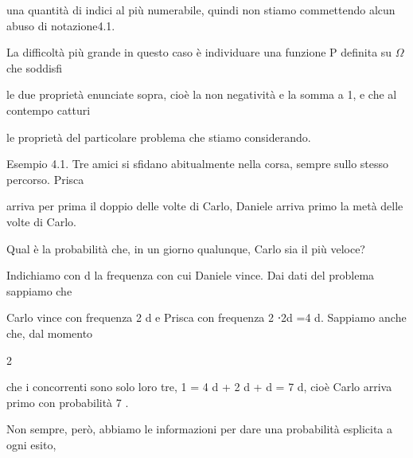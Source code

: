 \documentclass[a4paper,portrait,12pt]{article}
\begin{document}
\begin{flushleft}
una quantit\`{a} di indici al più numerabile, quindi non stiamo commettendo alcun abuso di notazione4.1.
\end{flushleft}


\begin{flushleft}
La difficolt\`{a} più grande in questo caso \`{e} individuare una funzione P definita su $\Omega$ che soddisfi
\end{flushleft}


\begin{flushleft}
le due propriet\`{a} enunciate sopra, cio\`{e} la non negativit\`{a} e la somma a 1, e che al contempo catturi
\end{flushleft}


\begin{flushleft}
le propriet\`{a} del particolare problema che stiamo considerando.
\end{flushleft}


\begin{flushleft}
Esempio 4.1. Tre amici si sfidano abitualmente nella corsa, sempre sullo stesso percorso. Prisca
\end{flushleft}


\begin{flushleft}
arriva per prima il doppio delle volte di Carlo, Daniele arriva primo la met\`{a} delle volte di Carlo.
\end{flushleft}


\begin{flushleft}
Qual \`{e} la probabilit\`{a} che, in un giorno qualunque, Carlo sia il più veloce?
\end{flushleft}


\begin{flushleft}
Indichiamo con d la frequenza con cui Daniele vince. Dai dati del problema sappiamo che
\end{flushleft}


\begin{flushleft}
Carlo vince con frequenza 2 d e Prisca con frequenza 2 ⋅2d =4 d. Sappiamo anche che, dal momento
\end{flushleft}


2


\begin{flushleft}
che i concorrenti sono solo loro tre, 1 = 4 d + 2 d + d = 7 d, cio\`{e} Carlo arriva primo con probabilit\`{a} 7 .
\end{flushleft}


\begin{flushleft}
Non sempre, per\`{o}, abbiamo le informazioni per dare una probabilit\`{a} esplicita a ogni esito,
\end{flushleft}
\end{document}
